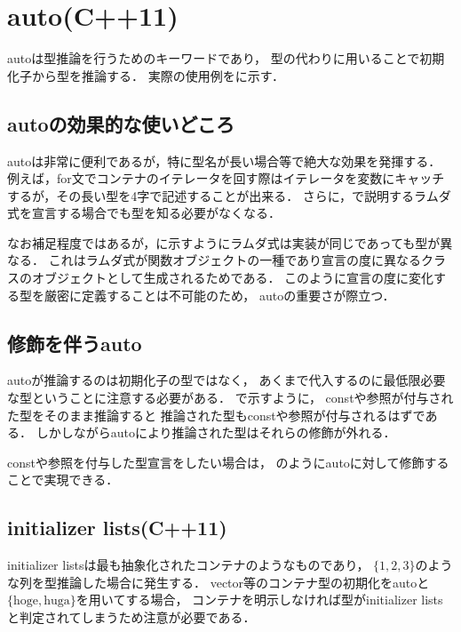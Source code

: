 \section{auto(C++11)}
autoは型推論を行うためのキーワードであり，
型の代わりに用いることで初期化子から型を推論する．
実際の使用例をに示す．


\subsection{autoの効果的な使いどころ}
autoは非常に便利であるが，特に型名が長い場合等で絶大な効果を発揮する．
例えば，for文でコンテナのイテレータを回す際はイテレータを変数にキャッチするが，その長い型を4字で記述することが出来る．
さらに，で説明するラムダ式を宣言する場合でも型を知る必要がなくなる．


なお補足程度ではあるが，に示すようにラムダ式は実装が同じであっても型が異なる．
これはラムダ式が関数オブジェクトの一種であり宣言の度に異なるクラスのオブジェクトとして生成されるためである．
このように宣言の度に変化する型を厳密に定義することは不可能のため，
autoの重要さが際立つ．


\subsection{修飾を伴うauto}
autoが推論するのは初期化子の型ではなく，
あくまで代入するのに最低限必要な型ということに注意する必要がある．
で示すように，
constや参照が付与された型をそのまま推論すると
推論された型もconstや参照が付与されるはずである．
しかしながらautoにより推論された型はそれらの修飾が外れる．

constや参照を付与した型宣言をしたい場合は，
のようにautoに対して修飾することで実現できる．



\subsection{initializer lists(C++11)}
initializer listsは最も抽象化されたコンテナのようなものであり，
$\{1,2,3\}$のような列を型推論した場合に発生する．
vector等のコンテナ型の初期化をautoと$\{\textrm{hoge},\textrm{huga}\}$を用いてする場合，
コンテナを明示しなければ型がinitializer listsと判定されてしまうため注意が必要である．

